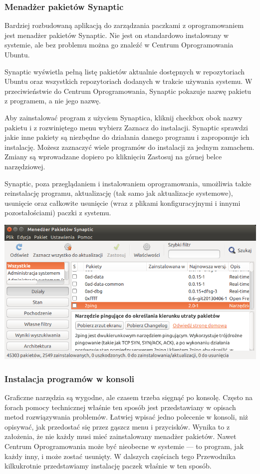 \subsubsection{Menadżer pakietów Synaptic}
Bardziej rozbudowaną aplikacją do zarządzania paczkami z oprogramowaniem jest menadżer pakietów \textcolor{ubuntu_orange}{Synaptic}. Nie jest on standardowo instalowany w systemie, ale bez problemu można go znaleźć w Centrum Oprogramowania Ubuntu.

Synaptic wyświetla pełną listę pakietów aktualnie dostępnych w repozytoriach Ubuntu oraz wszystkich repozytoriach dodanych w trakcie używania systemu. W przeciwieństwie do Centrum Oprogramowania, Synaptic pokazuje nazwę pakietu z programem, a nie jego nazwę.

Aby zainstalować program z użyciem Synaptica, kliknij checkbox obok nazwy pakietu i z rozwiniętego menu wybierz \textcolor{ubuntu_orange}{Zaznacz do instalacji}. Synaptic sprawdzi jakie inne pakiety są niezbędne do działania danego programu i zaproponuje ich instalację. Możesz zaznaczyć wiele programów do instalacji za jednym zamachem. Zmiany są wprowadzane dopiero po kliknięciu \textcolor{ubuntu_orange}{Zastosuj} na górnej belce narzędziowej.

Synaptic, poza przeglądaniem i instalowaniem oprogramowania, umożliwia także reinstalację programu, aktualizację (tak samo jak aktualizacje systemowe), usunięcie oraz całkowite usunięcie (wraz z plikami konfiguracyjnymi i innymi pozostałościami) paczki z systemu.

\begin{center}
	\includegraphics[width=\linewidth]{images/programy_synaptic.png}
\end{center}

\subsubsection{Instalacja programów w konsoli}
Graficzne narzędzia są wygodne, ale czasem trzeba sięgnąć po konsolę. Często na forach pomocy technicznej właśnie ten sposób jest przedstawiany w opisach metod rozwiązywania problemów. Łatwiej wpisać jedno polecenie w konsoli, niż opisywać, jak przedostać się przez gąszcz menu i przycisków. Wynika to z założenia, że nie każdy musi mieć zainstalowany menadżer pakietów. Nawet Centrum Oprogramowania może być nieobecne w systemie --- to program, jak każdy inny, i może zostać usunięty.
W dalszych częściach tego Przewodnika kilkukrotnie przedstawiamy instalację paczek właśnie w ten sposób.

